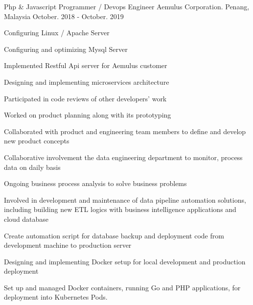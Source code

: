 \begin{cventries}
  \cventry
    {Php \& Javascript Programmer / Devops Engineer} %
    {Aemulus Corporation.} %
    {Penang, Malaysia} %
    {October. 2018 - October. 2019} %
    {
      \begin{cvitems} %
      	\item Configuring Linux / Apache Server
        \item Configuring and optimizing Mysql Server
       	\item Implemented Restful Api server for Aemulus customer
       	\item Designing and implementing microservices architecture
        \item Participated in code reviews of other developers’ work
        \item Worked on product planning along with its prototyping
        \item Collaborated with product and engineering team members to define and develop new product concepts
        \item Collaborative involvement the data engineering department to monitor, process data on daily basis
        \item Ongoing business process analysis to solve business problems
        \item Involved in development and maintenance of data pipeline automation solutions, including building new ETL logics with business intelligence applications and cloud database
        \item Create automation script for database backup and deployment code from development machine to production server
        \item Designing and implementing Docker setup for local development and production deployment
        \item Set up and managed Docker containers, running Go and PHP applications, for deployment into Kubernetes Pods.
      \end{cvitems}
    }


\end{cventries}
